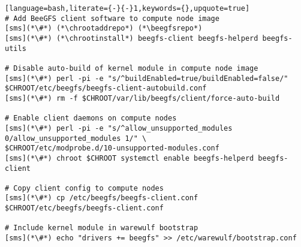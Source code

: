 \begin{lstlisting}[language=bash,literate={-}{-}1,keywords={},upquote=true]
# Add BeeGFS client software to compute node image
[sms](*\#*) (*\chrootaddrepo*) (*\beegfsrepo*)
[sms](*\#*) (*\chrootinstall*) beegfs-client beegfs-helperd beegfs-utils

# Disable auto-build of kernel module in compute node image
[sms](*\#*) perl -pi -e "s/^buildEnabled=true/buildEnabled=false/" $CHROOT/etc/beegfs/beegfs-client-autobuild.conf
[sms](*\#*) rm -f $CHROOT/var/lib/beegfs/client/force-auto-build

# Enable client daemons on compute nodes
[sms](*\#*) perl -pi -e "s/^allow_unsupported_modules 0/allow_unsupported_modules 1/" \
$CHROOT/etc/modprobe.d/10-unsupported-modules.conf
[sms](*\#*) chroot $CHROOT systemctl enable beegfs-helperd beegfs-client

# Copy client config to compute nodes
[sms](*\#*) cp /etc/beegfs/beegfs-client.conf $CHROOT/etc/beegfs/beegfs-client.conf

# Include kernel module in warewulf bootstrap
[sms](*\#*) echo "drivers += beegfs" >> /etc/warewulf/bootstrap.conf
\end{lstlisting}
